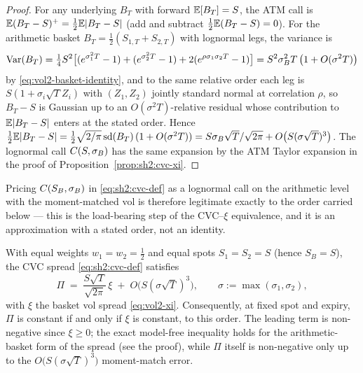 \begin{proof}
For any underlying $B_T$ with forward $\mathbb{E}[B_T] = S$, the ATM call is
$\mathbb{E}(B_T - S)^+ = \tfrac12 \mathbb{E}\lvert B_T - S\rvert$ (add and subtract
$\tfrac12 \mathbb{E}(B_T - S) = 0$). For the arithmetic basket
$B_T = \tfrac12(S_{1,T} + S_{2,T})$ with lognormal legs, the variance is
\[
  \operatorname{Var}(B_T)
  = \tfrac14 S^2 \bigl[(e^{\sigma_1^2 T} - 1) + (e^{\sigma_2^2 T} - 1)
    + 2(e^{\rho \sigma_1 \sigma_2 T} - 1)\bigr]
  = S^2 \sigma_B^2 T\,\bigl(1 + O(\sigma^2 T)\bigr)
\]
by \eqref{eq:vol2-basket-identity}, and to the same relative order each leg
is $S(1 + \sigma_i \sqrt{T} Z_i)$ with $(Z_1, Z_2)$ jointly standard normal
at correlation $\rho$, so $B_T - S$ is Gaussian up to an
$O(\sigma^2 T)$-relative residual whose contribution to
$\mathbb{E}\lvert B_T - S\rvert$ enters at the stated order. Hence
$\tfrac12 \mathbb{E}\lvert B_T - S\rvert
= \tfrac12 \sqrt{2/\pi}\,\mathrm{sd}(B_T)\,(1 + O(\sigma^2 T))
= S \sigma_B \sqrt{T}/\sqrt{2\pi} + O\bigl(S(\sigma\sqrt{T})^3\bigr)$. The
lognormal call $C(S, \sigma_B)$ has the same expansion by the ATM Taylor
expansion in the proof of Proposition~\ref{prop:sh2:cvc-xi}.
\end{proof}

Pricing $C(S_B, \sigma_B)$ in \eqref{eq:sh2:cvc-def} as a lognormal call on the
arithmetic level with the moment-matched vol is therefore legitimate
exactly to the order carried below --- this is the load-bearing step of the
CVC--$\xi$ equivalence, and it is an approximation with a stated order, not
an identity.

\begin{proposition}
\label{prop:sh2:cvc-xi}
With equal weights $w_1 = w_2 = \tfrac12$ and equal spots
$S_1 = S_2 = S$ (hence $S_B = S$), the CVC spread \eqref{eq:sh2:cvc-def}
satisfies
\begin{equation}\label{eq:sh2:cvc-xi}
  \Pi \;=\; \frac{S \sqrt{T}}{\sqrt{2\pi}}\, \xi
        \;+\; O\bigl(S(\sigma\sqrt{T})^3\bigr),
        \qquad \sigma := \max(\sigma_1, \sigma_2),
\end{equation}
with $\xi$ the basket vol spread \eqref{eq:vol2-xi}. Consequently, at
fixed spot and expiry, $\Pi$ is constant if and only if $\xi$ is constant,
to this order. The leading term is non-negative since $\xi \ge 0$; the
exact model-free inequality holds for the arithmetic-basket form of the
spread (see the proof), while $\Pi$ itself is non-negative only up to the
$O\bigl(S(\sigma\sqrt{T})^3\bigr)$ moment-match error.
\end{proposition}


